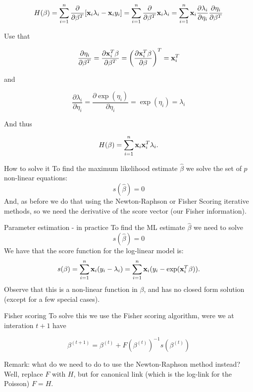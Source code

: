 \documentclass[
  ignorenonframetext,
]{beamer}
\begin{document}
\begin{frame}
\[H(\beta) = \sum_{i=1}^n \frac{\partial}{\partial\beta^T}[{\bf x}_i\lambda_i-{\bf x}_iy_i] = \sum_{i=1}^n \frac{\partial}{\partial\beta^T}{\bf x}_i\lambda_i = \sum_{i=1}^n {\bf x}_i \frac{\partial \lambda_i}{\partial \eta_i} \frac{\partial \eta_i}{\partial \beta^T} \]

Use that

\[ \frac{\partial \eta_i}{\partial \beta^T}=\frac{\partial {\bf x}_i^T\beta}{\partial \beta^T} = \left(\frac{\partial {\bf x}_i^T\beta}{\partial \beta}\right)^T = {\bf x}_i^T \]

and

\[ \frac{\partial \lambda_i}{\partial \eta_i} =  \frac{\partial\exp(\eta_i)}{\partial \eta_i} = \exp(\eta_i)=\lambda_i\]

And thus

\[H(\beta) =\sum_{i=1}^n {\bf x}_i {\bf x}_i^T\lambda_i.\]
\end{frame}

\begin{frame}
\begin{block}{How to solve it}
\label{how-to-solve-it}
To find the maximum likelihood estimate \(\hat{\beta}\) we solve the set
of \(p\) non-linear equations: \[s(\hat{\beta})=0\] And, as before we do
that using the Newton-Raphson or Fisher Scoring iterative methods, so we
need the derivative of the score vector (our Fisher information).
\end{block}
\end{frame}

\begin{frame}{Parameter estimation - in practice}
\label{parameter-estimation---in-practice}
To find the ML estimate \(\hat{\beta}\) we need to solve
\[s(\hat{\beta})=0\] We have that the score function for the log-linear
model is:
\[s(\beta)=\sum_{i=1}^n {\bf x}_i (y_i-\lambda_i)=\sum_{i=1}^n {\bf x}_i (y_i-\exp({\bf x}_i^T\beta)).\]
Observe that this is a non-linear function in \(\beta\), and has no
closed form solution (except for a few special cases).
\end{frame}

\begin{frame}
\begin{block}{Fisher scoring}
\label{fisher-scoring}
To solve this we use the Fisher scoring algorithm, were we at interation
\(t+1\) have

\[\beta^{(t+1)}=\beta^{(t)} + F(\beta^{(t)})^{-1} s(\beta^{(t)})\]

Remark: what do we need to do to use the Newton-Raphson method instead?
Well, replace \(F\) with \(H\), but for canonical link (which is the
log-link for the Poisson) \(F=H\).
\end{block}
\end{frame}
\end{document}
